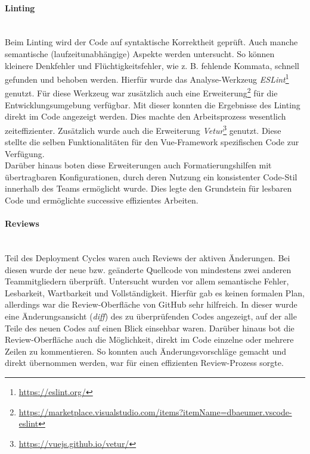 \documentclass[10pt, a4paper]{article}
\begin{document}
\begin{onehalfspace}
    \paragraph*{Linting}$~$ \\
    Beim Linting wird der Code auf syntaktische Korrektheit geprüft.
    Auch manche semantische (laufzeitunabhängige) Aspekte werden untersucht.
    So können kleinere Denkfehler und Flüchtigkeitsfehler, wie z. B. fehlende Kommata, schnell gefunden und behoben werden.
    Hierfür wurde das Analyse-Werkzeug \textit{ESLint}\footnote{\raggedright\url{https://eslint.org/}} genutzt.
    Für diese Werkzeug war zusätzlich auch eine Erweiterung\footnote{\raggedright\url{https://marketplace.visualstudio.com/items?itemName=dbaeumer.vscode-eslint}} für die Entwicklungsumgebung verfügbar.
    Mit dieser konnten die Ergebnisse des Linting direkt im Code angezeigt werden.
    Dies machte den Arbeitsprozess wesentlich zeiteffizienter.
    Zusätzlich wurde auch die Erweiterung \textit{Vetur}\footnote{\raggedright\url{https://vuejs.github.io/vetur/}} genutzt.
    Diese stellte die selben Funktionalitäten für den Vue-Framework spezifischen Code zur Verfügung.
    \\
    Darüber hinaus boten diese Erweiterungen auch Formatierungshilfen mit übertragbaren Konfigurationen, durch deren Nutzung ein konsistenter Code-Stil
    innerhalb des Teams ermöglicht wurde. Dies legte den Grundstein für lesbaren Code und ermöglichte successive effizientes Arbeiten.

    \paragraph*{Reviews}$~$ \\
    Teil des Deployment Cycles waren auch Reviews der aktiven Änderungen.
    Bei diesen wurde der neue bzw. geänderte Quellcode von mindestens zwei anderen Teammitgliedern überprüft.
    Untersucht wurden vor allem semantische Fehler, Lesbarkeit, Wartbarkeit und Vollständigkeit.
    Hierfür gab es keinen formalen Plan, allerdings war die Review-Oberfläche von GitHub sehr hilfreich.
    In dieser wurde eine Änderungsansicht (\textit{diff}) des zu überprüfenden Codes angezeigt, auf der alle Teile des neuen Codes auf einen Blick einsehbar waren.
    Darüber hinaus bot die Review-Oberfläche auch die Möglichkeit, direkt im Code einzelne oder mehrere Zeilen zu kommentieren.
    So konnten auch Änderungsvorschläge gemacht und direkt übernommen werden, war für einen effizienten Review-Prozess sorgte.


\end{onehalfspace}
\end{document}
